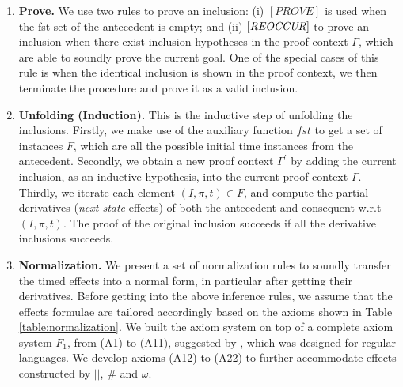 \documentclass[acmsmall,10pt,review]{acmart}
\newcommand{\code}[1]{{\tt{\ensuremath{\m{#1}}}}}
\newcommand{\codeme}[1]{{\tt{\ensuremath{#1}}}}
\newcommand{\m}{\mathit}
\newcommand\tabref[1]{Table \textcolor{black}{\ref{#1}}.}
\begin{document}
{\begin{enumerate}
\vspace{-4mm}


\item 
\textbf{Prove.}
\label{Prove}
We use two rules to prove an inclusion: (i) \codeme{[PROVE]} is used when the fst set of the antecedent is empty; and (ii) $\code{[REOCCUR]}$ to prove an inclusion
when there exist inclusion hypotheses 
in the proof context $\m{\Gamma}$, which are able to soundly prove the current goal. One of the special cases of this rule is when the identical inclusion is shown in the proof context, we then terminate the procedure and prove it as a valid inclusion. 


\item 
\textbf{Unfolding (Induction).}
\label{unfolding}
This is the inductive step of unfolding the inclusions. Firstly, we make use of the auxiliary function \code{fst} to get a set of instances \code{F}, which are all the possible initial time instances from the antecedent. 
Secondly, we obtain a new proof context \code{\Gamma^\prime} by adding the current inclusion, as an inductive hypothesis, into the current proof context \code{\Gamma}. 
Thirdly, we iterate each element \code{(I, \pi, t) \in F}, and compute the partial derivatives (\emph{next-state} effects) of both the antecedent and consequent w.r.t \code{(I, \pi, t)}. The proof of the original inclusion succeeds if all the derivative inclusions succeeds.



\item 
\textbf{Normalization.}
We present a set of normalization rules to soundly transfer the timed effects into a normal form, in particular after getting their derivatives. 
Before getting into the above inference rules, we assume that the effects formulae are tailored accordingly based on the axioms shown in
\tabref{table:normalization}
We built the axiom system on top of a complete axiom system \code{F_1}, from (A1) to (A11), suggested by \cite{salomaa1966two}, which was designed for regular languages. We develop axioms (A12) to (A22) to further accommodate effects constructed by \code{||},   \code{\#} and \code{\omega}.




\end{enumerate}}
\end{document}
